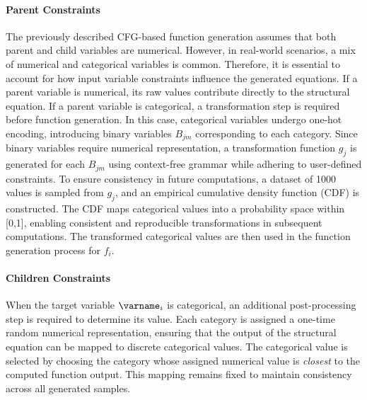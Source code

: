 \documentclass{uai2024} %
\begin{document}
            \paragraph{Parent Constraints}
                The previously described CFG-based function generation assumes that both parent and child variables are numerical. 
                However, in real-world scenarios, a mix of numerical and categorical variables is common. 
                Therefore, it is essential to account for how input variable constraints influence the generated equations.
                If a parent variable is numerical, its raw values contribute directly to the structural equation. 
                If a parent variable is categorical, a transformation step is required before function generation. 
                In this case, categorical variables undergo one-hot encoding, introducing binary variables $ B_{jm} $ corresponding to each category. 
                Since binary variables require numerical representation, a transformation function $ g_j $ is generated for each $ B_{jm} $ using context-free grammar while adhering to user-defined constraints. 
                To ensure consistency in future computations, a dataset of 1000 values is sampled from $ g_j $, and an empirical cumulative density function (CDF) is constructed. 
                The CDF maps categorical values into a probability space within [0,1], enabling consistent and reproducible transformations in subsequent computations.
                The transformed categorical values are then used in the function generation process for $ f_i $.


            \paragraph{Children Constraints}
                When the target variable $ \varname_i $ is categorical, an additional post-processing step is required to determine its value. 
                Each category is assigned a one-time random numerical representation, ensuring that the output of the structural equation can be mapped to discrete categorical values. 
                The categorical value is selected by choosing the category whose assigned numerical value is \emph{closest} to the computed function output. 
                This mapping remains fixed to maintain consistency across all generated samples.
\end{document}
